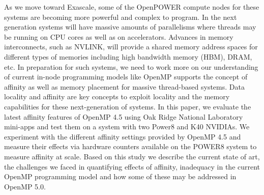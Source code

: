 As we move toward Exascale, some of the OpenPOWER compute nodes for these systems 
are becoming more powerful and complex to program. In the next generation systems will have massive amounts of parallelisms where threads 
may be running on CPU cores as well as on accelerators. Advances in memory interconnects, such as NVLINK, will provide a 
shared memory address spaces for different types of memories including high bandwidth memory (HBM), DRAM, etc. 
In preparation for such systems, we need to work more on our understanding of current in-node programming models like OpenMP supports
the concept of affinity as well as memory placement for massive thread-based systems. Data locality and affinity are key
concepts to exploit locality and the memory capabilities for these next-generation of systems. 
In this paper, we evaluate the latest affinity features of OpenMP 4.5 using Oak Ridge National Laboratory mini-apps 
and test them on a system with two Power8 and K40 NVIDIAs. We experiment with the different affinity settings provided by OpenMP 4.5 and measure their effects via hardware counters available on the POWER8 system to measure affinity at scale. Based on this study we describe the current state of art, the challenges we faced in quantifying effects of affinity, inadequacy in the current OpenMP programming model and how some of these may be addressed in OpenMP 5.0.